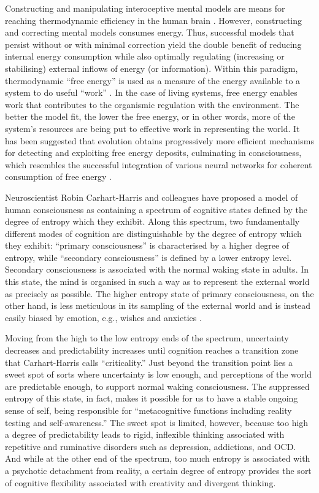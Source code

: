 \begin{CJK}{UTF8}{gbsn}
Constructing and manipulating interoceptive mental models are means for reaching thermodynamic efficiency in the human brain \citep{Yufik2013}. However, constructing and correcting mental models consumes energy.  Thus, successful models that persist without or with minimal correction yield the double benefit of reducing internal energy consumption while also optimally regulating (increasing or stabilising) external inflows of energy (or information).  Within this paradigm, thermodynamic ``free energy'' is used as a measure of the energy available to a system to do useful ``work'' \citep{Stoner2000}.  In the case of living systems, free energy enables work that contributes to the organismic regulation with the environment. The better the model fit, the lower the free energy, or in other words, more of the system's resources are being put to effective work in representing the world.  It has been suggested that evolution obtains progressively more efficient mechanisms for detecting and exploiting free energy deposits, culminating in consciousness, which resembles the successful integration of various neural networks for coherent consumption of free energy \citep{Annila2016}.

Neuroscientist Robin Carhart-Harris and colleagues \textcite{Carhart-Harris2014} have proposed a model of human consciousness as containing a spectrum of cognitive states defined by the degree of entropy which they exhibit.   Along this spectrum, two fundamentally different modes of cognition are distinguishable by the degree of entropy which they exhibit: ``primary consciousness'' is characterised by a higher degree of entropy, while ``secondary consciousness'' is defined by a lower entropy level.  Secondary consciousness is associated with the normal waking state in adults.  In this state, the mind is organised in such a way as to represent the external world as precisely as possible.  The higher entropy state of primary consciousness, on the other hand, is less meticulous in its sampling of the external world and is instead easily biased by emotion, e.g., wishes and anxieties \citep[7]{Carhart-Harris2014}.

Moving from the high to the low entropy ends of the spectrum, uncertainty decreases and predictability increases until cognition reaches a transition zone that Carhart-Harris calls ``criticality.''  Just beyond the transition point lies a sweet spot of sorts where uncertainty is low enough, and perceptions of the world are predictable enough, to support normal waking consciousness.  The suppressed entropy of this state, in fact, makes it possible for us to have a stable ongoing sense of self, being responsible for ``metacognitive functions including reality testing and self-awareness.''  The sweet spot is limited, however, because too high a degree of predictability leads to rigid, inflexible thinking associated with repetitive and ruminative disorders such as depression, addictions, and OCD.   And while at the other end of the spectrum, too much entropy is associated with a psychotic detachment from reality, a certain degree of entropy provides the sort of cognitive flexibility associated with creativity and divergent thinking.


\end{CJK}
